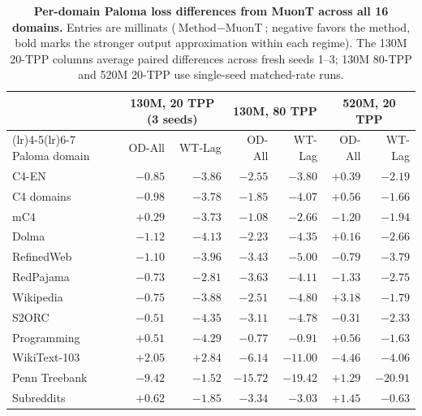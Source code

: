 \begin{table}[tbp]\centering\small
\setlength{\tabcolsep}{7.0pt}
\caption{\textbf{Per-domain Paloma loss differences from MuonT across all 16 domains.} Entries are millinats ($\text{Method}-\text{MuonT}$; negative favors the method, bold marks the stronger output approximation within each regime). The 130M 20-TPP columns average paired differences across fresh seeds 1--3; 130M 80-TPP and 520M 20-TPP use single-seed matched-rate runs.}\label{tab:paloma_full}
\begin{tabularx}{\textwidth}{@{}>{\raggedright\arraybackslash}Xrrrrrr@{}}
\toprule
& \multicolumn{2}{c}{130M, 20 TPP (3 seeds)} & \multicolumn{2}{c}{130M, 80 TPP} & \multicolumn{2}{c}{520M, 20 TPP} \\
\cmidrule(lr){2-3}\cmidrule(lr){4-5}\cmidrule(lr){6-7}
Paloma domain & OD-All & WT-Lag & OD-All & WT-Lag & OD-All & WT-Lag \\
\midrule
C4-EN & $-0.85$ & $\mathbf{-3.86}$ & $-2.55$ & $\mathbf{-3.80}$ & $+0.39$ & $\mathbf{-2.19}$ \\
C4 domains & $-0.98$ & $\mathbf{-3.78}$ & $-1.85$ & $\mathbf{-4.07}$ & $+0.56$ & $\mathbf{-1.66}$ \\
mC4 & $+0.29$ & $\mathbf{-3.73}$ & $-1.08$ & $\mathbf{-2.66}$ & $-1.20$ & $\mathbf{-1.94}$ \\
Dolma & $-1.12$ & $\mathbf{-4.13}$ & $-2.23$ & $\mathbf{-4.35}$ & $+0.16$ & $\mathbf{-2.66}$ \\
RefinedWeb & $-1.10$ & $\mathbf{-3.96}$ & $-3.43$ & $\mathbf{-5.00}$ & $-0.79$ & $\mathbf{-3.79}$ \\
RedPajama & $-0.73$ & $\mathbf{-2.81}$ & $-3.63$ & $\mathbf{-4.11}$ & $-1.33$ & $\mathbf{-2.75}$ \\
Wikipedia & $-0.75$ & $\mathbf{-3.88}$ & $-2.51$ & $\mathbf{-4.80}$ & $+3.18$ & $\mathbf{-1.79}$ \\
S2ORC & $-0.51$ & $\mathbf{-4.35}$ & $-3.11$ & $\mathbf{-4.78}$ & $-0.31$ & $\mathbf{-2.33}$ \\
Programming & $+0.51$ & $\mathbf{-4.29}$ & $-0.77$ & $\mathbf{-0.91}$ & $+0.56$ & $\mathbf{-1.63}$ \\
WikiText-103 & $\mathbf{+2.05}$ & $+2.84$ & $-6.14$ & $\mathbf{-11.00}$ & $\mathbf{-4.46}$ & $-4.06$ \\
Penn Treebank & $\mathbf{-9.42}$ & $-1.52$ & $-15.72$ & $\mathbf{-19.42}$ & $+1.29$ & $\mathbf{-20.91}$ \\
Subreddits & $+0.62$ & $\mathbf{-1.85}$ & $\mathbf{-3.34}$ & $-3.03$ & $+1.45$ & $\mathbf{-0.63}$ \\

\end{tabularx}
\end{table}
